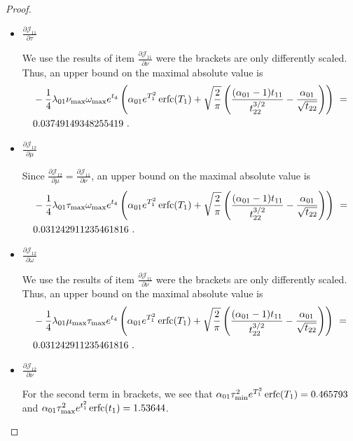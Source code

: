 \documentclass{article}
\DeclareMathOperator{\erfc}{erfc}
\begin{document}
\begin{proof}
\begin{itemize}
\item $\frac{\partial {\mathcal J}_{11}}{\partial \tau}$

We use the results of  item $\frac{\partial {\mathcal J}_{11}}{\partial \nu}$
were the brackets are only differently scaled.
Thus, an upper bound on the maximal absolute value is 
\begin{align}
&-\frac{1}{4} \lambda_{\rm 01} \nu_{\rm max} \omega_{\rm max}
  e^{t_4} \left(\alpha_{\rm 01} e^{T_1^2}
  \erfc (T_1)+\sqrt{\frac{2}{\pi }}
  \left(\frac{(\alpha_{\rm 01}-1)
  t_{11}}{t_{22}^{3/2}}-\frac{\alpha_{\rm 01}}{\sqrt{t_{22}}}\right)\right) \ = \\ \nonumber
& 0.03749149348255419\ .
\end{align}

\item $\frac{\partial {\mathcal J}_{12}}{\partial \mu}$

Since $\frac{\partial {\mathcal J}_{12}}{\partial \mu}=\frac{\partial {\mathcal J}_{11}}{\partial \nu}$,
an upper bound on the maximal absolute value is 
\begin{align}
&-\frac{1}{4} \lambda_{\rm 01} \tau_{\rm max} \omega_{\rm max}
  e^{t_4} \left(\alpha_{\rm 01} e^{T_1^2}
  \erfc (T_1)+\sqrt{\frac{2}{\pi }}
  \left(\frac{(\alpha_{\rm 01}-1)
  t_{11}}{t_{22}^{3/2}}-\frac{\alpha_{\rm 01}}{\sqrt{t_{22}}}\right)\right) \ = \\ \nonumber
& 0.031242911235461816\ .
\end{align}

\item $\frac{\partial {\mathcal J}_{12}}{\partial \omega}$

We use the results of  item $\frac{\partial {\mathcal J}_{11}}{\partial \nu}$
were the brackets are only differently scaled.
Thus, an upper bound on the maximal absolute value is 
\begin{align}
&-\frac{1}{4} \lambda_{\rm 01} \mu_{\rm max} \tau_{\rm max}
  e^{t_4} \left(\alpha_{\rm 01} e^{T_1^2}
  \erfc (T_1)+\sqrt{\frac{2}{\pi }}
  \left(\frac{(\alpha_{\rm 01}-1)
  t_{11}}{t_{22}^{3/2}}-\frac{\alpha_{\rm 01}}{\sqrt{t_{22}}}\right)\right) \ = \\ \nonumber
& 0.031242911235461816\ .
\end{align}

\item $\frac{\partial {\mathcal J}_{12}}{\partial \nu}$

For the second term in brackets, we see that
$\alpha_{\rm 01} \tau_{\rm min}^2 e^{T_1^2} \erfc (T_1)=0.465793$ and $\alpha_{\rm 01} \tau_{\rm max}^2 e^{t_1^2} \erfc (t_1)=1.53644$.


\end{itemize}
\end{proof}
\end{document}
